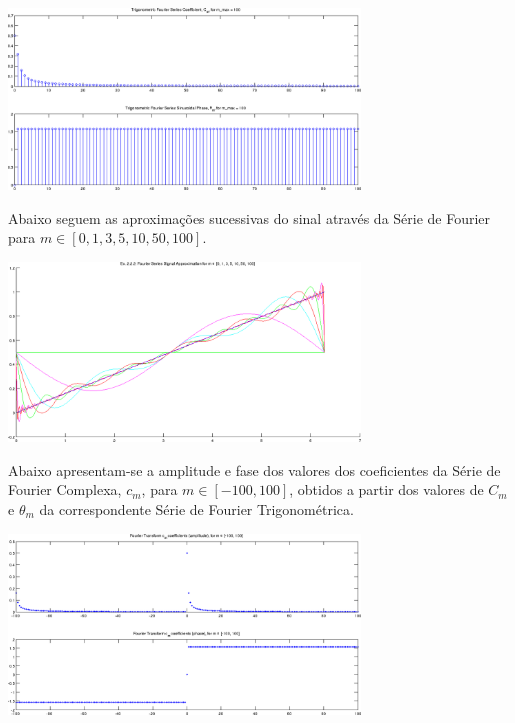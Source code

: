 \documentclass[a4paper]{article}
\begin{document}
\begin{center}
	\includegraphics[width=0.70\textwidth]{images/ex2_2_2_cm_tm.png}
	\label{fig:ex2_2_2_cm_tm}
\end{center}

\noindent Abaixo seguem as aproximações sucessivas do sinal através da Série de Fourier para $m \in [0, 1, 3, 5, 10, 50, 100]$.
\begin{center}
	\includegraphics[width=0.70\textwidth]{images/ex2_2_2_approx.png}
	\label{fig:ex2_2_2_approx}
\end{center}

\noindent Abaixo apresentam-se a amplitude e fase dos valores dos coeficientes da Série de Fourier Complexa, $c_m$, para $m \in [-100, 100]$, obtidos a partir dos valores de $C_m$ e $\theta_m$ da correspondente Série de Fourier Trigonométrica.
\begin{center}
	\includegraphics[width=0.70\textwidth]{images/ex2_2_2_complex_cm.png}
	\label{fig:ex2_2_2_complex_cm}
\end{center}
\end{document}
